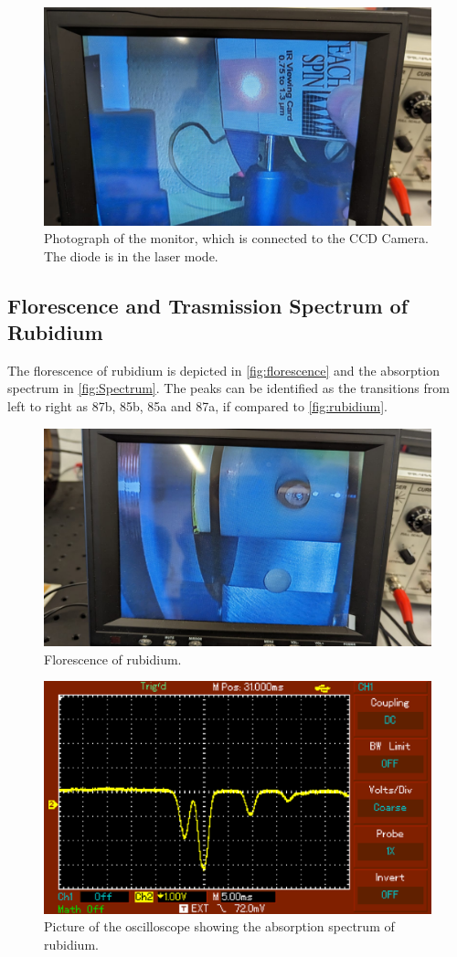 \begin{figure}[H]
    \centering
    \includegraphics[width=\textwidth]{data/01.pdf}
    \caption{Photograph of the monitor, which is connected to the CCD Camera. The diode is in the laser mode.}
    \label{fig:laser}
\end{figure}


\subsection{Florescence and Trasmission Spectrum  of Rubidium}

The florescence of rubidium is depicted in \autoref{fig:florescence} and the absorption spectrum in \autoref{fig:Spectrum}.
The peaks can be identified as the transitions from left to right as 87b, 85b, 85a and 87a, if compared to \autoref{fig:rubidium}.

\begin{figure}[H]
    \centering
    \includegraphics[width=\textwidth]{data/06.pdf}
    \caption{Florescence of rubidium.}
    \label{fig:florescence}
\end{figure}

\begin{figure}[H]
    \centering
    \includegraphics[width=\textwidth]{data/5.pdf}
    \caption{Picture of the oscilloscope showing the absorption spectrum of rubidium.}
    \label{fig:Spectrum}
\end{figure}
